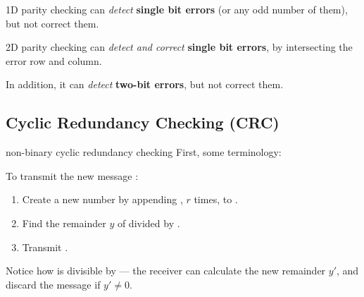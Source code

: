 1D parity checking can \textit{detect} \textbf{single bit errors}
(or any odd number of them), but not correct them.

2D parity checking can \textit{detect and correct} \textbf{single bit errors},
by intersecting the error row and column.

In addition, it can \textit{detect} \textbf{two-bit errors}, but not correct them.

\subsection{Cyclic Redundancy Checking (CRC)}
\begin{defn}{non-binary cyclic redundancy checking}
    First, some terminology:
    \begin{itemize}
    \end{itemize}

    To transmit the new message :
    \begin{enumerate}
        \item Create a new number  by appending , $r$ times, to .
        \item Find the remainder $y$ of  divided by .
        \item Transmit .
    \end{enumerate}

    Notice how  is divisible by  --- the receiver can calculate the new remainder $y'$,
    and discard the message if $y' \neq 0$.
\end{defn}

